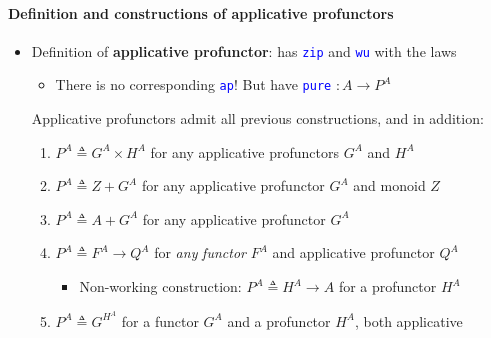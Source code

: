 \paragraph{Definition and constructions of applicative profunctors}
\begin{itemize}
\item Definition of \textbf{applicative profunctor}: has \texttt{\textcolor{blue}{\footnotesize{}zip}}
and \texttt{\textcolor{blue}{\footnotesize{}wu}} with the laws
\begin{itemize}
\item There is no corresponding \texttt{\textcolor{blue}{\footnotesize{}ap}}!
But have \texttt{\textcolor{blue}{\footnotesize{}pure}} {\footnotesize{}$:A\rightarrow P^{A}$} 
\end{itemize}
Applicative profunctors admit all previous constructions, and in addition:
\begin{enumerate}
\item $P^{A}\triangleq G^{A}\times H^{A}$ for any applicative profunctors
$G^{A}$ and $H^{A}$
\item $P^{A}\triangleq Z+G^{A}$ for any applicative profunctor $G^{A}$
and monoid $Z$
\item $P^{A}\triangleq A+G^{A}$ for any applicative profunctor $G^{A}$
\item $P^{A}\triangleq F^{A}\rightarrow Q^{A}$ for \emph{any} \emph{functor}
$F^{A}$ and applicative profunctor $Q^{A}$
\begin{itemize}
\item Non-working construction: $P^{A}\triangleq H^{A}\rightarrow A$ for
a profunctor $H^{A}$
\end{itemize}
\item $P^{A}\triangleq G^{H^{A}}$ for a functor $G^{A}$ and a profunctor
$H^{A}$, both applicative
\end{enumerate}
\end{itemize}


